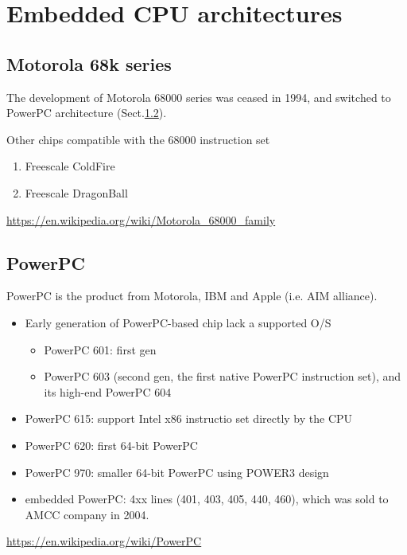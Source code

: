 \chapter{Embedded CPU architectures}


\section{Motorola 68k series}

The development of Motorola 68000 series was ceased in 1994, and switched to
PowerPC architecture (Sect.\ref{sec:PowerPC}).

Other chips compatible with the 68000 instruction set
\begin{enumerate}
  \item Freescale ColdFire
  \item Freescale DragonBall
\end{enumerate}
\url{https://en.wikipedia.org/wiki/Motorola_68000_family}

\section{PowerPC}
\label{sec:PowerPC}

PowerPC is the product from Motorola, IBM and Apple (i.e. AIM alliance).
\begin{itemize}
  \item Early generation of PowerPC-based chip lack a supported O/S
  \begin{itemize}
    \item PowerPC 601: first gen
    \item PowerPC 603 (second gen, the first native PowerPC instruction set),
    and its high-end PowerPC 604
  \end{itemize}
  
  \item PowerPC 615: support Intel x86 instructio set directly by the CPU
  
  \item PowerPC 620: first 64-bit PowerPC
  \item PowerPC 970: smaller 64-bit PowerPC using POWER3 design
  
  \item embedded PowerPC: 4xx lines (401, 403, 405, 440, 460), which was sold to
  AMCC company in 2004.
  
  
\end{itemize}
\url{https://en.wikipedia.org/wiki/PowerPC}

